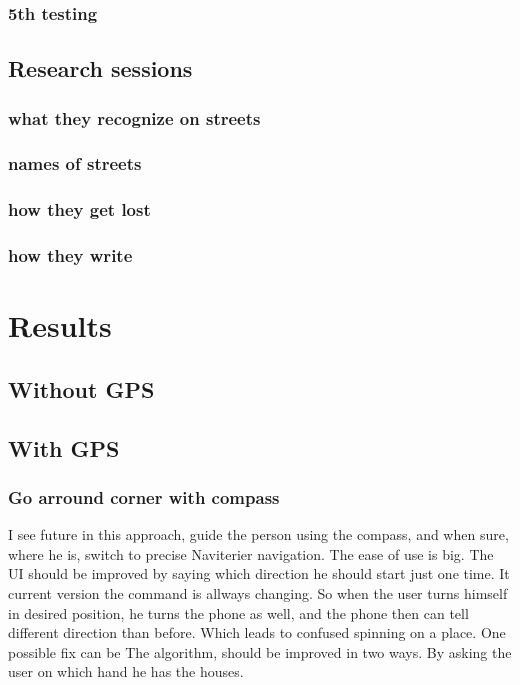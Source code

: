 \documentclass[11pt,oneside,a4paper]{book}
\begin{document}
			\subsection{5th testing}
				\label{sec:5th-testing}
		\section{Research sessions}
			\subsection{what they recognize on streets}
			\subsection{names of streets}
			\subsection{how they get lost}
			\subsection{how they write}
	
	\chapter{Results}
		\section{Without GPS}
		\section{With GPS}
			\subsection{Go arround corner with compass}
			I see future in this approach, guide the person using the compass, and when sure, where he is, switch to precise Naviterier navigation.
			The ease of use is big.
			The UI should be improved by saying which direction he should start just one time. It current version the command is allways changing. So when the user turns himself in desired position, he turns the phone as well, and the phone then can tell different direction than before. Which leads to confused spinning on a place. One possible fix can be 
			The algorithm, should be improved in two ways. By asking the user on which hand he has the houses. 
\end{document}
